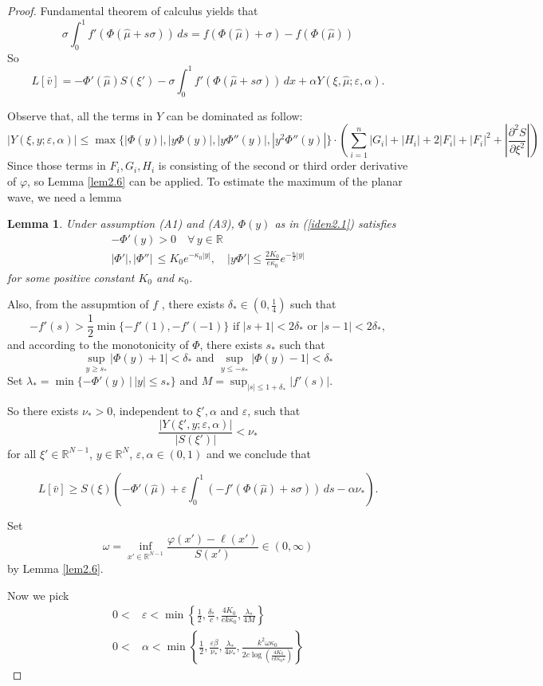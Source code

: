 \documentclass[12pt, a4paper]{article}
\newtheorem{lemma}[thm]{Lemma}
\numberwithin{equation}{section}
\newcommand{\R}{\mathbb{R}}
\newcommand{\hmu}{\hat{\mu}}
\newcommand{\pdd}[2]{\frac{\partial^2 #1}{\partial #2^2}}
\begin{document}
\begin{CJK}{UTF8}{bkai}
\begin{proof}
Fundamental theorem of calculus yields that 
\[
	\sigma\int_0^1f'(\Phi(\hmu+s\sigma))\,ds=f(\Phi(\hmu)+\sigma)-f(\Phi(\hmu))
\]
So
\[
	L[\bar{v}]=-\Phi'(\hmu)S(\xi')-\sigma\int_0^1f'(\Phi(\hmu+s\sigma))\,dx+\alpha Y(\xi,\hmu;\varepsilon,\alpha).
\]

Observe that, all the terms in $Y$ can be dominated as follow:
\[
	|Y(\xi,y;\varepsilon,\alpha)|\leq \max\{|\Phi(y)|,|y\Phi(y)|,|y\Phi''(y)|,|y^2\Phi''(y)|\}\cdot\left(\sum_{i=1}^n|G_i|+|H_i|+2|F_i|+|F_i|^2+\left|\pdd{S}{\xi}\right|\right)
\]
Since those terms in $F_i,G_i,H_i$ is consisting of the second or third order derivative of $\varphi$, so Lemma \ref{lem2.6} can be applied. To estimate the maximum of the planar wave, we need a lemma

\begin{lemma}\label{lem2.8}
	Under assumption (A1) and (A3), $\Phi(y)$ as in (\ref{iden2.1}) satisfies
\begin{align*}
	-\Phi'(y)>0\quad\forall\,y\in\R\\
	|\Phi'|,|\Phi''|\,\leq K_0e^{-\kappa_0|y|},\quad |y\Phi'|\leq\frac{2K_0}{e\kappa_0}e^{-\frac{\kappa}{2}|y|}
\end{align*}
for some positive constant $K_0$ and $\kappa_0$.
\end{lemma} 

Also, from the assupmtion of $f$ , there exists $\delta_*\in(0,\frac{1}{4})$ such that
\[
	-f'(s)>\frac{1}{2}\min\{-f'(1),-f'(-1)\}\mbox{ if }|s+1|<2\delta_*\mbox{ or }|s-1|<2\delta_*,
\] 
and according to the monotonicity of $\Phi$, there exists $s_*$ such that
\[
	\sup_{y\geq s_*}|\Phi(y)+1|<\delta_*\mbox{ and }\sup_{y\leq -s_*}|\Phi(y)-1|<\delta_*
\]
Set $\lambda_*=\min\{-\Phi'(y)\,|\,|y|\leq s_*\}$ and $M=\sup_{|s|\leq 1+\delta_*}|f'(s)|$.

So there exists $\nu_*>0$, independent to $\xi',\alpha$ and $\varepsilon$, such that
\[
	\frac{|Y(\xi',y;\varepsilon,\alpha)|}{|S(\xi')|}<\nu_*
\]
for all $\xi'\in\R^{N-1}$, $y\in\R^N$, $\varepsilon,\alpha\in(0,1)$ and we conclude that

\begin{equation}\label{iden2.22}
	L[\bar{v}]\geq S(\xi)\left(-\Phi'(\hmu)+\varepsilon\int_0^1(-f'(\Phi(\hmu)+s\sigma))\,ds-\alpha\nu_*\right).
\end{equation}

Set
\[
	\omega=\inf_{x'\in\R^{N-1}}\frac{\varphi(x')-\ell(x')}{S(x')}\in(0,\infty)
\]
by Lemma \ref{lem2.6}. 

Now we pick
\begin{align}
	0<&\varepsilon<\min\left\{\frac{1}{2},\frac{\delta_*}{c},\frac{4K_0}{ek\kappa_0},\frac{\lambda_*}{4M}\right\}\\
	0<&\alpha<\min\left\{\frac{1}{2},\frac{\varepsilon\beta}{\nu_*},\frac{\lambda_*}{4\nu_*},\frac{k^2\omega\kappa_0}{2c\log(\frac{4K_0}{ek\kappa_0\varepsilon})}\right\}
\end{align}


\end{proof}
\end{CJK}
\end{document}
